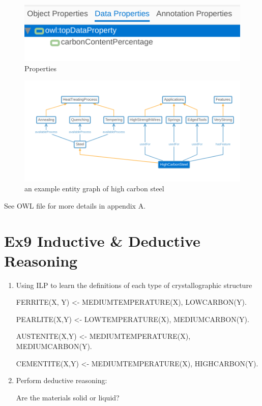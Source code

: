 \documentclass[12pt]{article}
\begin{document}
{\begin{figure}[ht]
{		\begin{minipage}{7cm}
			\centering
			\includegraphics[scale=0.25]{figs/ex8-data-property.png}
		\end{minipage}
	}
	\caption{Properties}
	\label{fig:label10}
\end{figure}
\begin{figure}[H]
	\centering
	\includegraphics[scale=0.3]{figs/ex8-highcarbonsteel-example.png}
	\caption{an example entity graph of high carbon steel}
	\label{fig:label11}
\end{figure}

See OWL file for more details in appendix A.

\section{Ex9 Inductive \& Deductive Reasoning}
\label{sec: ex9}
\begin{enumerate}[1.]
	\item Using ILP to learn the definitions of each type of crystallographic structure
	
	FERRITE(X, Y) <- MEDIUMTEMPERATURE(X), LOWCARBON(Y).
	
	PEARLITE(X,Y) <- LOWTEMPERATURE(X), MEDIUMCARBON(Y).
	
	AUSTENITE(X,Y) <- MEDIUMTEMPERATURE(X), MEDIUMCARBON(Y).
	
	CEMENTITE(X,Y) <- MEDIUMTEMPERATURE(X), HIGHCARBON(Y).
	\item Perform deductive reasoning:
	
	Are the materials solid or liquid?
	

\end{enumerate}}
\end{document}
